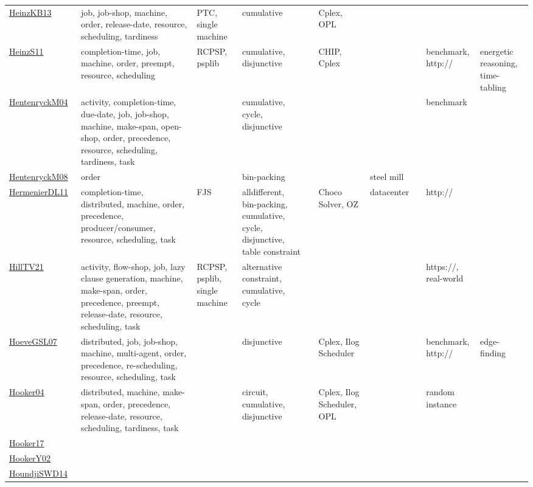 {\begin{longtable}{p{3cm}p{4cm}p{2cm}p{2cm}p{2cm}p{2cm}p{2cm}p{2cm}p{2cm}p{2cm}}
\href{papers/HeinzKB13.pdf}{HeinzKB13}~\cite{HeinzKB13} & job, job-shop, machine, order, release-date, resource, scheduling, tardiness & PTC, single machine & cumulative &  & Cplex, OPL &  &  &  & \\
\href{papers/HeinzS11.pdf}{HeinzS11}~\cite{HeinzS11} & completion-time, job, machine, order, preempt, resource, scheduling & RCPSP, psplib & cumulative, disjunctive &  & CHIP, Cplex &  &  & benchmark, http:// & energetic reasoning, time-tabling\\
\href{papers/HentenryckM04.pdf}{HentenryckM04}~\cite{HentenryckM04} & activity, completion-time, due-date, job, job-shop, machine, make-span, open-shop, order, precedence, resource, scheduling, tardiness, task &  & cumulative, cycle, disjunctive &  &  &  &  & benchmark & \\
\href{papers/HentenryckM08.pdf}{HentenryckM08}~\cite{HentenryckM08} & order &  & bin-packing &  &  & steel mill &  &  & \\
\href{papers/HermenierDL11.pdf}{HermenierDL11}~\cite{HermenierDL11} & completion-time, distributed, machine, order, precedence, producer/consumer, resource, scheduling, task & FJS & alldifferent, bin-packing, cumulative, cycle, disjunctive, table constraint &  & Choco Solver, OZ & datacenter &  & http:// & \\
\href{papers/HillTV21.pdf}{HillTV21}~\cite{HillTV21} & activity, flow-shop, job, lazy clause generation, machine, make-span, order, precedence, preempt, release-date, resource, scheduling, task & RCPSP, psplib, single machine & alternative constraint, cumulative, cycle &  &  &  &  & https://, real-world & \\
\href{papers/HoeveGSL07.pdf}{HoeveGSL07}~\cite{HoeveGSL07} & distributed, job, job-shop, machine, multi-agent, order, precedence, re-scheduling, resource, scheduling, task &  & disjunctive &  & Cplex, Ilog Scheduler &  &  & benchmark, http:// & edge-finding\\
\href{papers/Hooker04.pdf}{Hooker04}~\cite{Hooker04} & distributed, machine, make-span, order, precedence, release-date, resource, scheduling, tardiness, task &  & circuit, cumulative, disjunctive &  & Cplex, Ilog Scheduler, OPL &  &  & random instance & \\
\href{papers/Hooker17.pdf}{Hooker17}~\cite{Hooker17} &  &  &  &  &  &  &  &  & \\
\href{papers/HookerY02.pdf}{HookerY02}~\cite{HookerY02} &  &  &  &  &  &  &  &  & \\
\href{papers/HoundjiSWD14.pdf}{HoundjiSWD14}~\cite{HoundjiSWD14} &  &  &  &  &  &  &  &  & \\

\end{longtable}}
